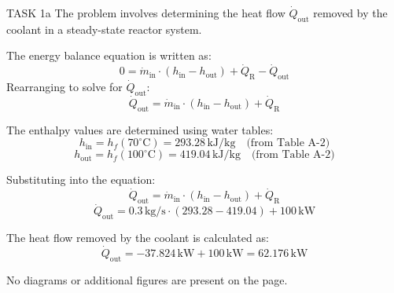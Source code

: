 TASK 1a  
The problem involves determining the heat flow \( \dot{Q}_{\text{out}} \) removed by the coolant in a steady-state reactor system.  

The energy balance equation is written as:  
\[
0 = \dot{m}_{\text{in}} \cdot (h_{\text{in}} - h_{\text{out}}) + \dot{Q}_{\text{R}} - \dot{Q}_{\text{out}}
\]  
Rearranging to solve for \( \dot{Q}_{\text{out}} \):  
\[
\dot{Q}_{\text{out}} = \dot{m}_{\text{in}} \cdot (h_{\text{in}} - h_{\text{out}}) + \dot{Q}_{\text{R}}
\]  

The enthalpy values are determined using water tables:  
\[
h_{\text{in}} = h_f(70^\circ\text{C}) = 293.28 \, \text{kJ/kg} \quad \text{(from Table A-2)}
\]  
\[
h_{\text{out}} = h_f(100^\circ\text{C}) = 419.04 \, \text{kJ/kg} \quad \text{(from Table A-2)}
\]  

Substituting into the equation:  
\[
\dot{Q}_{\text{out}} = \dot{m}_{\text{in}} \cdot (h_{\text{in}} - h_{\text{out}}) + \dot{Q}_{\text{R}}
\]  
\[
\dot{Q}_{\text{out}} = 0.3 \, \text{kg/s} \cdot (293.28 - 419.04) + 100 \, \text{kW}
\]  

The heat flow removed by the coolant is calculated as:  
\[
\dot{Q}_{\text{out}} = -37.824 \, \text{kW} + 100 \, \text{kW} = 62.176 \, \text{kW}
\]  

No diagrams or additional figures are present on the page.